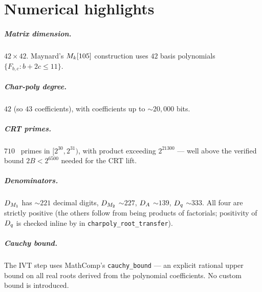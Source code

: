 \chapter{Numerical highlights}\label{ch:numeric}

\paragraph{Matrix dimension.} $42 \times 42$.
Maynard's $M_k[105]$ construction uses $42$ basis polynomials
$\{F_{b,c} : b + 2c \le 11\}$.

\paragraph{Char-poly degree.} $42$ (so $43$ coefficients), with
coefficients up to ${\sim}20{,}000$ bits.

\paragraph{CRT primes.} $710$ \Uintsf\ primes in $[2^{30}, 2^{31})$,
with product exceeding $2^{21300}$ — well above the verified bound
$2B < 2^{6500}$ needed for the CRT lift.

\paragraph{Denominators.} $D_{M_1}$ has ${\sim}221$ decimal digits,
$D_{M_2}$ ${\sim}227$, $D_A$ ${\sim}139$, $D_q$ ${\sim}333$. All four
are strictly positive (the others follow from being products of
factorials; positivity of $D_q$ is checked inline by \vmcompute{} in
\texttt{charpoly\_root\_transfer}).

\paragraph{Cauchy bound.} The IVT step uses MathComp's
\texttt{cauchy\_bound} — an explicit rational upper bound on all real
roots derived from the polynomial coefficients. No custom bound is
introduced.

